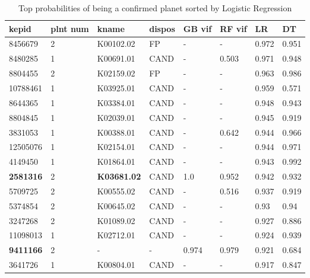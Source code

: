 \begin{table}[!htbp]
 \centering
 \caption{Top probabilities of being a confirmed planet sorted by Logistic Regression}
 \label{dataGBvifRFvifLRDTtab} 
  \begin{tabular}
{| 
 p{}| 
 p{}| 
 p{}| 
 p{}| 
 p{}| 
 p{}| 
 p{}| 
 p{}| 
}\hline 
\textbf{kepid} &\textbf{plnt num} &\textbf{kname} &\textbf{dispos} &\textbf{GB vif} &\textbf{RF vif} &\textbf{LR} &\textbf{DT} \\ \hline 
8456679 &2 &K00102.02 &FP &- &- &0.972 &0.951 \\ \hline 
8480285 &1 &K00691.01 &CAND &- &0.503 &0.971 &0.948 \\ \hline 
8804455 &2 &K02159.02 &FP &- &- &0.963 &0.986 \\ \hline 
10788461 &1 &K03925.01 &CAND &- &- &0.959 &0.571 \\ \hline 
8644365 &1 &K03384.01 &CAND &- &- &0.948 &0.943 \\ \hline 
8804845 &1 &K02039.01 &CAND &- &- &0.945 &0.919 \\ \hline 
3831053 &1 &K00388.01 &CAND &- &0.642 &0.944 &0.966 \\ \hline 
12505076 &1 &K02154.01 &CAND &- &- &0.944 &0.971 \\ \hline 
4149450 &1 &K01864.01 &CAND &- &- &0.943 &0.992 \\ \hline 
\textbf{2581316} &2 & \textbf{K03681.02} &CAND &1.0 &0.952 &0.942 &0.932 \\ \hline 
5709725 &2 &K00555.02 &CAND &- &0.516 &0.937 &0.919 \\ \hline 
5374854 &2 &K00645.02 &CAND &- &- &0.93 &0.94 \\ \hline 
3247268 &2 &K01089.02 &CAND &- &- &0.927 &0.886 \\ \hline 
11098013 &1 &K02712.01 &CAND &- &- &0.924 &0.939 \\ \hline 
\textbf{9411166} &2 &- &- &0.974 &0.979 &0.921 &0.684 \\ \hline 
3641726 &1 &K00804.01 &CAND &- &- &0.917 &0.847 \\ \hline 
\end{tabular} 
\end{table}
